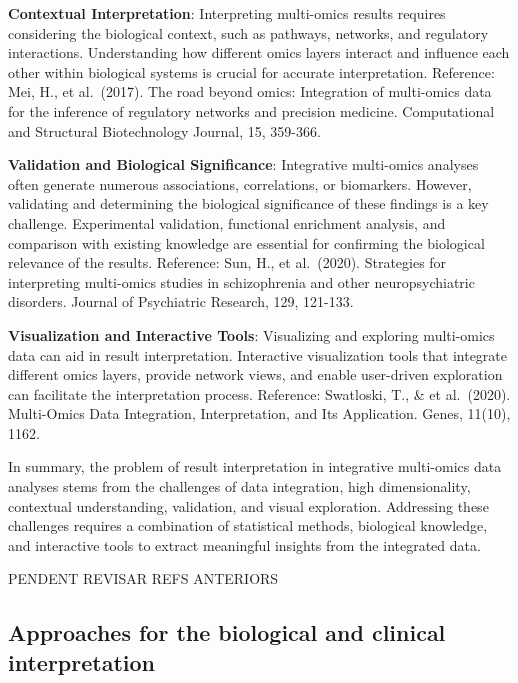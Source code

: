 \documentclass[a4paper, nobind]{templates/ociamthesis}
\begin{document}
\textbf{Contextual Interpretation}: Interpreting multi-omics results requires considering the biological context, such as pathways, networks, and regulatory interactions. Understanding how different omics layers interact and influence each other within biological systems is crucial for accurate interpretation. Reference: Mei, H., et al.~(2017). The road beyond omics: Integration of multi-omics data for the inference of regulatory networks and precision medicine. Computational and Structural Biotechnology Journal, 15, 359-366.

\textbf{Validation and Biological Significance}: Integrative multi-omics analyses often generate numerous associations, correlations, or biomarkers. However, validating and determining the biological significance of these findings is a key challenge. Experimental validation, functional enrichment analysis, and comparison with existing knowledge are essential for confirming the biological relevance of the results. Reference: Sun, H., et al.~(2020). Strategies for interpreting multi-omics studies in schizophrenia and other neuropsychiatric disorders. Journal of Psychiatric Research, 129, 121-133.

\textbf{Visualization and Interactive Tools}: Visualizing and exploring multi-omics data can aid in result interpretation. Interactive visualization tools that integrate different omics layers, provide network views, and enable user-driven exploration can facilitate the interpretation process. Reference: Swatloski, T., \& et al.~(2020). Multi-Omics Data Integration, Interpretation, and Its Application. Genes, 11(10), 1162.

In summary, the problem of result interpretation in integrative multi-omics data analyses stems from the challenges of data integration, high dimensionality, contextual understanding, validation, and visual exploration. Addressing these challenges requires a combination of statistical methods, biological knowledge, and interactive tools to extract meaningful insights from the integrated data.

PENDENT REVISAR REFS ANTERIORS

\hypertarget{approaches-for-the-biological-and-clinical-interpretation}{%
\subsection{Approaches for the biological and clinical interpretation}\label{approaches-for-the-biological-and-clinical-interpretation}}
\end{document}
